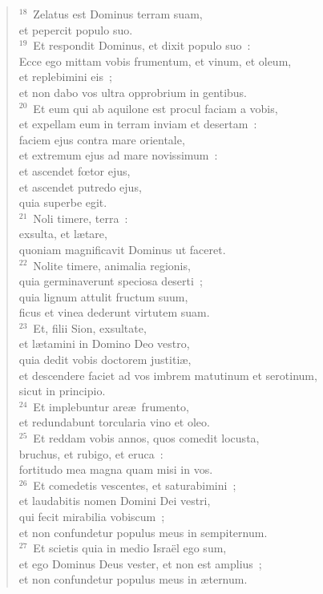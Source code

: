 \begin{verse}${}^{18}$~Zelatus est Dominus terram suam,\\ et pepercit populo suo.\\
${}^{19}$~Et respondit Dominus, et dixit populo suo~:\\ Ecce ego mittam vobis frumentum, et vinum, et oleum,\\ et replebimini eis~;\\ et non dabo vos ultra opprobrium in gentibus.\\
${}^{20}$~Et eum qui ab aquilone est procul faciam a vobis,\\ et expellam eum in terram inviam et desertam~:\\ faciem ejus contra mare orientale,\\ et extremum ejus ad mare novissimum~:\\ et ascendet fœtor ejus,\\ et ascendet putredo ejus,\\ quia superbe egit.\\
${}^{21}$~Noli timere, terra~:\\ exsulta, et l\ae tare,\\ quoniam magnificavit Dominus ut faceret.\\
${}^{22}$~Nolite timere, animalia regionis,\\ quia germinaverunt speciosa deserti~;\\ quia lignum attulit fructum suum,\\ ficus et vinea dederunt virtutem suam.\\
${}^{23}$~Et, filii Sion, exsultate,\\ et l\ae tamini in Domino Deo vestro,\\ quia dedit vobis doctorem justiti\ae ,\\ et descendere faciet ad vos imbrem matutinum et serotinum,\\ sicut in principio.\\
${}^{24}$~Et implebuntur are\ae\ frumento,\\ et redundabunt torcularia vino et oleo.\\
${}^{25}$~Et reddam vobis annos, quos comedit locusta,\\ bruchus, et rubigo, et eruca~:\\ fortitudo mea magna quam misi in vos.\\
${}^{26}$~Et comedetis vescentes, et saturabimini~;\\ et laudabitis nomen Domini Dei vestri,\\ qui fecit mirabilia vobiscum~;\\ et non confundetur populus meus in sempiternum.\\
${}^{27}$~Et scietis quia in medio Isra\"el ego sum,\\ et ego Dominus Deus vester, et non est amplius~;\\ et non confundetur populus meus in \ae ternum.\end{verse}


